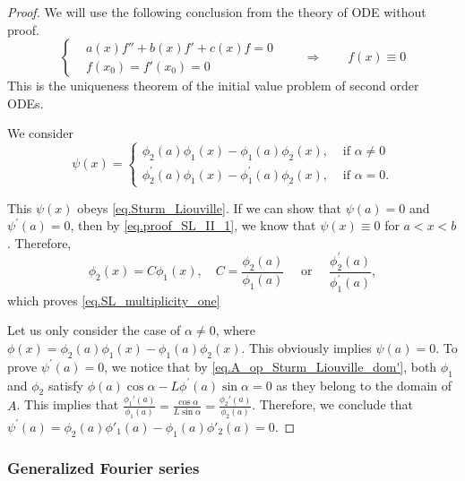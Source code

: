 \begin{proof}
We will use the following conclusion from the theory of ODE without proof. 
\begin{equation}\label{eq.proof_SL_II_1}
    \left\{
        \begin{aligned}
            &a(x)f'' + b(x)f' + c(x)f = 0
            \\
            & f(x_0) = f'(x_0) = 0
        \end{aligned}
    \right.\qquad\Rightarrow\qquad f(x)\equiv 0
\end{equation}
This is the uniqueness theorem of the initial value problem of second order ODEs.

We consider
$$
\psi(x)= \begin{cases}
    \phi_2(a) \phi_1(x)-\phi_1(a) \phi_2(x), & \text { if } \alpha \neq 0 
    \\ 
    \phi_2^{\prime}(a) \phi_1(x)-\phi_1^{\prime}(a) \phi_2(x), & \text { if } \alpha=0 .\end{cases}
$$

This $\psi(x)$ obeys \eqref{eq.Sturm_Liouville}. If we can show that $\psi(a)=0$ and $\psi^{\prime}(a)=0$, then by \eqref{eq.proof_SL_II_1}, we know that $\psi(x)\equiv 0$ for $ a<x<b$. Therefore,
\begin{equation}
    \phi_2(x)=C \phi_1(x), \quad C=\frac{\phi_2(a)}{\phi_1(a)} \quad \text { or } \quad \frac{\phi_2^{\prime}(a)}{\phi_1^{\prime}(a)},
\end{equation}
which proves \eqref{eq.SL_multiplicity_one}

Let us only consider the case of $\alpha \neq 0$, where $\phi(x) = \phi_2(a) \phi_1(x)-\phi_1(a) \phi_2(x)$. This obviously implies $\psi(a)=0$. To prove $\psi^{\prime}(a)=0$, we notice that by \eqref{eq.A_op_Sturm_Liouville_dom'}, both $\phi_1$ and $\phi_2$ satisfy $\phi(a) \cos \alpha-L \phi^{\prime}(a) \sin \alpha=0$ as they belong to the domain of $A$. This implies that $\frac{\phi_1'(a)}{\phi_1(a)} = \frac{\cos \alpha}{L\sin \alpha} = \frac{\phi_2'(a)}{\phi_2(a)}$. Therefore, we conclude that $\psi^{\prime}(a) = \phi_2(a) \phi'_1(a)-\phi_1(a) \phi'_2(a) =0$.
\end{proof}


\subsubsection{Generalized Fourier series}


